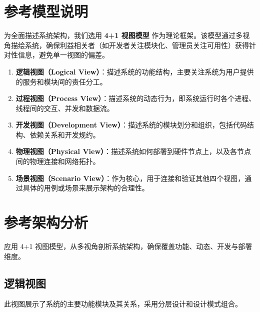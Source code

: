 \documentclass[a4paper,12pt]{article}
\begin{document}
\section{参考模型说明}
为全面描述系统架构，我们选用 \textbf{4+1 视图模型} 作为理论框架。该模型通过多视角描绘系统，确保利益相关者（如开发者关注模块化、管理员关注可用性）获得针对性信息，避免单一视图的偏差。
\begin{enumerate}
  \item \textbf{逻辑视图（Logical View）}：描述系统的功能结构，主要关注系统为用户提供的服务和模块间的责任分工。
  \item \textbf{过程视图（Process View）}：描述系统的动态行为，即系统运行时各个进程、线程间的交互、并发和数据流。
  \item \textbf{开发视图（Development View）}：描述系统的模块划分和组织，包括代码结构、依赖关系和开发规约。
  \item \textbf{物理视图（Physical View）}：描述系统如何部署到硬件节点上，以及各节点间的物理连接和网络拓扑。
  \item \textbf{场景视图（Scenario View）}：作为核心，用于连接和验证其他四个视图，通过具体的用例或场景来展示架构的合理性。
\end{enumerate}

\section{参考架构分析}
应用 4+1 视图模型，从多视角剖析系统架构，确保覆盖功能、动态、开发与部署维度。

\subsection{逻辑视图}
此视图展示了系统的主要功能模块及其关系，采用分层设计和设计模式组合。
\end{document}
